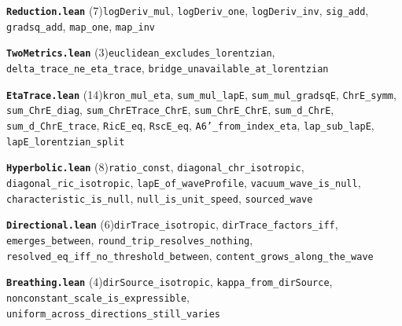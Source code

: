 \documentclass[11pt,a4paper]{article}
\theoremstyle{sudef}
\begin{document}
\noindent\textbf{\texttt{Reduction.lean}} (7)\quad \texttt{logDeriv\_\allowbreak mul}, \texttt{logDeriv\_\allowbreak one}, \texttt{logDeriv\_\allowbreak inv}, \texttt{sig\_\allowbreak add}, \texttt{gradsq\_\allowbreak add}, \texttt{map\_\allowbreak one}, \texttt{map\_\allowbreak inv}\par\smallskip
\noindent\textbf{\texttt{TwoMetrics.lean}} (3)\quad \texttt{euclidean\_\allowbreak excludes\_\allowbreak lorentzian}, \texttt{delta\_\allowbreak trace\_\allowbreak ne\_\allowbreak eta\_\allowbreak trace}, \texttt{bridge\_\allowbreak unavailable\_\allowbreak at\_\allowbreak lorentzian}\par\smallskip
\noindent\textbf{\texttt{EtaTrace.lean}} (14)\quad \texttt{kron\_\allowbreak mul\_\allowbreak eta}, \texttt{sum\_\allowbreak mul\_\allowbreak lapE}, \texttt{sum\_\allowbreak mul\_\allowbreak gradsqE}, \texttt{ChrE\_\allowbreak symm}, \texttt{sum\_\allowbreak ChrE\_\allowbreak diag}, \texttt{sum\_\allowbreak ChrETrace\_\allowbreak ChrE}, \texttt{sum\_\allowbreak ChrE\_\allowbreak ChrE}, \texttt{sum\_\allowbreak d\_\allowbreak ChrE}, \texttt{sum\_\allowbreak d\_\allowbreak ChrE\_\allowbreak trace}, \texttt{RicE\_\allowbreak eq}, \texttt{RscE\_\allowbreak eq}, \texttt{A6'\_\allowbreak from\_\allowbreak index\_\allowbreak eta}, \texttt{lap\_\allowbreak sub\_\allowbreak lapE}, \texttt{lapE\_\allowbreak lorentzian\_\allowbreak split}\par\smallskip
\noindent\textbf{\texttt{Hyperbolic.lean}} (8)\quad \texttt{ratio\_\allowbreak const}, \texttt{diagonal\_\allowbreak chr\_\allowbreak isotropic}, \texttt{diagonal\_\allowbreak ric\_\allowbreak isotropic}, \texttt{lapE\_\allowbreak of\_\allowbreak waveProfile}, \texttt{vacuum\_\allowbreak wave\_\allowbreak is\_\allowbreak null}, \texttt{characteristic\_\allowbreak is\_\allowbreak null}, \texttt{null\_\allowbreak is\_\allowbreak unit\_\allowbreak speed}, \texttt{sourced\_\allowbreak wave}\par\smallskip
\noindent\textbf{\texttt{Directional.lean}} (6)\quad \texttt{dirTrace\_\allowbreak isotropic}, \texttt{dirTrace\_\allowbreak factors\_\allowbreak iff}, \texttt{emerges\_\allowbreak between}, \texttt{round\_\allowbreak trip\_\allowbreak resolves\_\allowbreak nothing}, \texttt{resolved\_\allowbreak eq\_\allowbreak iff\_\allowbreak no\_\allowbreak threshold\_\allowbreak between}, \texttt{content\_\allowbreak grows\_\allowbreak along\_\allowbreak the\_\allowbreak wave}\par\smallskip
\noindent\textbf{\texttt{Breathing.lean}} (4)\quad \texttt{dirSource\_\allowbreak isotropic}, \texttt{kappa\_\allowbreak from\_\allowbreak dirSource}, \texttt{nonconstant\_\allowbreak scale\_\allowbreak is\_\allowbreak expressible}, \texttt{uniform\_\allowbreak across\_\allowbreak directions\_\allowbreak still\_\allowbreak varies}\par\smallskip
\end{document}

